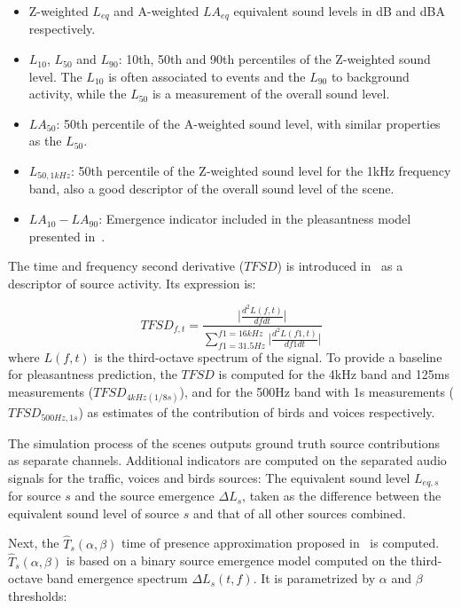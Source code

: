 \documentclass[twocolumn]{article}
\begin{document}
\begin{itemize}
\item Z-weighted $L_{eq}$ and A-weighted $LA_{eq}$ equivalent sound levels in dB and dBA respectively.
\item $L_{10}$, $L_{50}$ and $L_{90}$: 10th, 50th and 90th percentiles of the Z-weighted sound level. The $L_{10}$ is often associated to events and the $L_{90}$ to background activity, while the $L_{50}$ is a measurement of the overall sound level.
\item $LA_{50}$: 50th percentile of the A-weighted sound level, with similar properties as the $L_{50}$.
\item $L_{50, 1kHz}$: 50th percentile of the Z-weighted sound level for the 1kHz frequency band, also a good descriptor of the overall sound level of the scene.
\item $LA_{10}-LA_{90}$: Emergence indicator included in the pleasantness model presented in~\cite{ricciardi2014}.
\end{itemize}

The time and frequency second derivative ($TFSD$) is introduced in~\cite{aumond2017} as a descriptor of source activity. Its expression is:

\begin{equation}
TFSD_{f, t} = \frac{\lvert\frac{d^2L(f, t)}{dfdt}\rvert}{\sum_{f1=31.5Hz}^{f1=16kHz}\lvert\frac{d^2L(f1, t)}{df1dt}\rvert}
\end{equation}
where $L(f, t)$ is the third-octave spectrum of the signal. To provide a baseline for pleasantness prediction, the $TFSD$ is computed for the 4kHz band and 125ms measurements ($TFSD_{4kHz(1/8s)}$), and for the 500Hz band with 1s measurements ($TFSD_{500Hz, 1s}$) as estimates of the contribution of birds and voices respectively.

The simulation process of the scenes outputs ground truth source contributions as separate channels. Additional indicators are computed on the separated audio signals for the traffic, voices and birds sources: The equivalent sound level $L_{eq, s}$ for source $s$ and the source emergence $\Delta L_{s}$, taken as the difference between the equivalent sound level of source $s$ and that of all other sources combined.

Next, the $\hat T_s(\alpha, \beta)$ time of presence approximation proposed in~\cite{gontier2018} is computed. $\hat T_s(\alpha, \beta)$ is based on a binary source emergence model computed on the third-octave band emergence spectrum $\Delta L_{s}(t, f)$. It is parametrized by $\alpha$ and $\beta$ thresholds:
\end{document}
